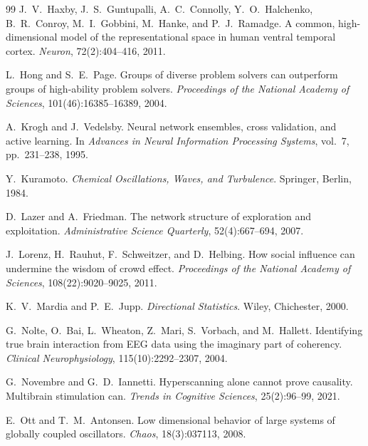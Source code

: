 \documentclass[11pt]{article}
\begin{document}
\begin{thebibliography}{99}
J.~V.~Haxby, J.~S.~Guntupalli, A.~C.~Connolly, Y.~O.~Halchenko, B.~R.~Conroy, M.~I.~Gobbini, M.~Hanke, and P.~J.~Ramadge.
\newblock A common, high-dimensional model of the representational space in human ventral temporal cortex.
\newblock \emph{Neuron}, 72(2):404--416, 2011.

L.~Hong and S.~E.~Page.
\newblock Groups of diverse problem solvers can outperform groups of high-ability problem solvers.
\newblock \emph{Proceedings of the National Academy of Sciences}, 101(46):16385--16389, 2004.

A.~Krogh and J.~Vedelsby.
\newblock Neural network ensembles, cross validation, and active learning.
\newblock In \emph{Advances in Neural Information Processing Systems}, vol.~7, pp.~231--238, 1995.

Y.~Kuramoto.
\newblock \emph{Chemical Oscillations, Waves, and Turbulence}.
\newblock Springer, Berlin, 1984.

D.~Lazer and A.~Friedman.
\newblock The network structure of exploration and exploitation.
\newblock \emph{Administrative Science Quarterly}, 52(4):667--694, 2007.

J.~Lorenz, H.~Rauhut, F.~Schweitzer, and D.~Helbing.
\newblock How social influence can undermine the wisdom of crowd effect.
\newblock \emph{Proceedings of the National Academy of Sciences}, 108(22):9020--9025, 2011.

K.~V.~Mardia and P.~E.~Jupp.
\newblock \emph{Directional Statistics}.
\newblock Wiley, Chichester, 2000.

G.~Nolte, O.~Bai, L.~Wheaton, Z.~Mari, S.~Vorbach, and M.~Hallett.
\newblock Identifying true brain interaction from EEG data using the imaginary part of coherency.
\newblock \emph{Clinical Neurophysiology}, 115(10):2292--2307, 2004.

G.~Novembre and G.~D.~Iannetti.
\newblock Hyperscanning alone cannot prove causality. Multibrain stimulation can.
\newblock \emph{Trends in Cognitive Sciences}, 25(2):96--99, 2021.

E.~Ott and T.~M.~Antonsen.
\newblock Low dimensional behavior of large systems of globally coupled oscillators.
\newblock \emph{Chaos}, 18(3):037113, 2008.


\end{thebibliography}
\end{document}
